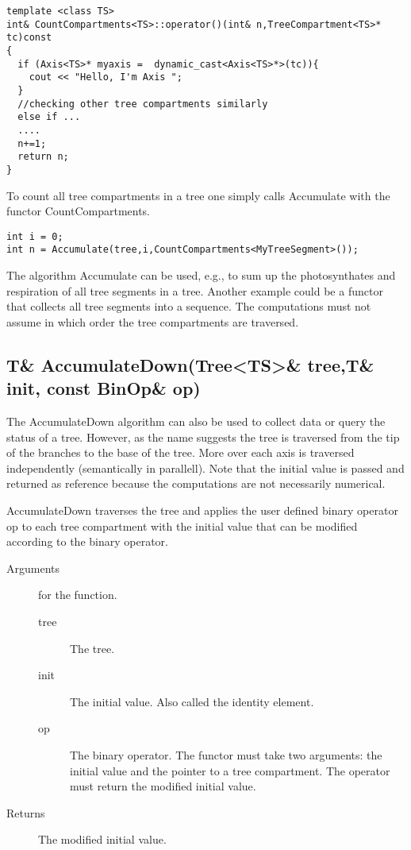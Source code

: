 \begin{verbatim}
template <class TS>
int& CountCompartments<TS>::operator()(int& n,TreeCompartment<TS>* tc)const
{
  if (Axis<TS>* myaxis =  dynamic_cast<Axis<TS>*>(tc)){
    cout << "Hello, I'm Axis ";
  }
  //checking other tree compartments similarly
  else if ...  
  ....
  n+=1;
  return n;
}
\end{verbatim}

To count all tree compartments in a tree one simply calls Accumulate
with the functor CountCompartments.

\begin{verbatim}
int i = 0;
int n = Accumulate(tree,i,CountCompartments<MyTreeSegment>());
\end{verbatim}

The  algorithm    Accumulate can be    used,   e.g.,  to   sum up  the
photosynthates and respiration of all tree segments in a tree. Another
example could be   a functor that collects all   tree segments into  a
sequence.  The computations must  not assume in  which order the  tree
compartments are traversed.

\subsection{T\& AccumulateDown(Tree<TS>\& tree,T\& init, const BinOp\& op)}

The AccumulateDown algorithm can also be used to collect data or query
the status   of a tree.  However, as   the name  suggests  the tree is
traversed  from the  tip  of the  branches to  the  base of  the tree.
More over each    axis  is  traversed   independently  (semantically in
parallell).   Note that  the initial value  is passed  and returned as
reference because the computations are not necessarily numerical.

AccumulateDown traverses the tree and  applies the user defined binary
operator op  to each tree compartment  with the initial value that can
be modified according to the binary operator.

\begin{description}
   \item [Arguments] for the function.
     \begin{description}
        \item [tree] The tree.
        \item [init] The initial value. Also called the identity
     element.
        \item [op] The binary operator. The functor must take two
     arguments: the initial value and the pointer to a tree compartment. The
     operator must return the modified initial value.
     \end{description} 
   \item[Returns] The  modified initial value.
\end{description} 

